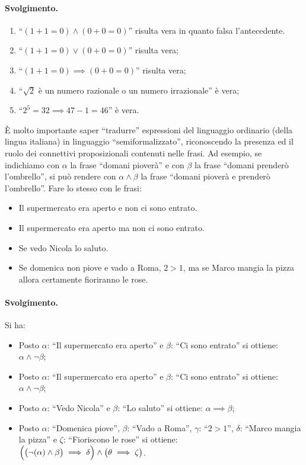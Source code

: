 \paragraph*{Svolgimento.}
\begin{enumerate}
	\item ``$(1+1=0)\land(0+0=0)$'' risulta vera in quanto falsa l'antecedente.
	\item ``$(1+1=0) \lor (0+0=0)$'' risulta vera;
	\item ``$(1+1=0) \implies (0+0=0)$'' risulta vera;
	\item ``$\sqrt{2}$ è un numero razionale o un numero irrazionale'' è vera;
	\item  ``$2^{5}=32 \implies 47-1=46$'' è vera.
\end{enumerate}
\begin{flushright}
	\blacksquare
\end{flushright}

\begin{exsbox}
	È molto importante saper ``tradurre'' espressioni del linguaggio ordinario (della lingua italiana) in linguaggio ``semiformalizzato'', riconoscendo la presenza ed il ruolo dei connettivi proposizionali contenuti nelle frasi. Ad esempio, se indichiamo con $\alpha$ la frase ``domani pioverà'' e con $\beta$ la frase ``domani prenderò l'ombrello'', si può rendere con $\alpha \land \beta$ la frase ``domani pioverà e prenderò l'ombrello''. Fare lo stesso con le frasi:
	\begin{itemize}
		\item Il supermercato era aperto e non ci sono entrato.
		\item Il supermercato era aperto ma non ci sono entrato.
		\item Se vedo Nicola lo saluto.
		\item Se domenica non piove e vado a Roma, $2>1$, ma se Marco mangia la pizza allora certamente fioriranno le rose.
	\end{itemize}
\end{exsbox}
\paragraph*{Svolgimento.} Si ha:
\begin{itemize}
	\item Posto $\alpha$: ``Il supermercato era aperto'' e $\beta$: ``Ci sono entrato'' si ottiene: $\alpha \land \neg \beta$;
	\item Posto $\alpha$: ``Il supermercato era aperto'' e $\beta$: ``Ci sono entrato'' si ottiene: $\alpha \land \neg \beta$;
	\item Posto $\alpha$: ``Vedo Nicola'' e $\beta$: ``Lo saluto'' si ottiene: $\alpha \implies \beta$;
	\item Posto $\alpha$: ``Domenica piove'', $\beta$: ``Vado a Roma'', $\gamma$: ``$2>1$'', $\delta$: ``Marco mangia la pizza'' e $\zeta$: ``Fioriscono le rose'' si ottiene:
	$\Bigl( \bigl( \neg (\alpha) \land \beta \bigr) \implies \delta \Bigr) \land \bigl(\theta \implies \zeta \bigr)$.
\end{itemize}
\begin{flushright}
	\blacksquare
\end{flushright}


